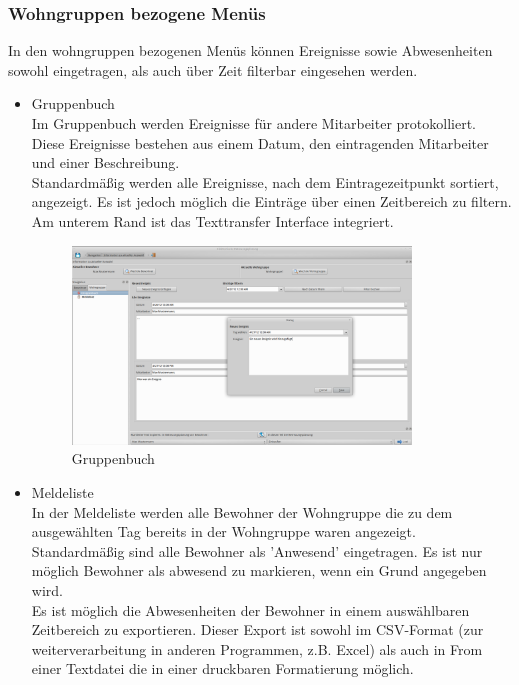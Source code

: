 \subsubsection{Wohngruppen bezogene Menüs}
In den wohngruppen bezogenen Menüs können Ereignisse sowie Abwesenheiten sowohl eingetragen, als auch über Zeit filterbar eingesehen werden.
\begin{itemize}
	\item Gruppenbuch\mbox{}\\
	\noindent
	Im Gruppenbuch werden Ereignisse für andere Mitarbeiter protokolliert. Diese Ereignisse bestehen aus einem Datum, den eintragenden Mitarbeiter und einer Beschreibung.\\Standardmäßig werden alle Ereignisse, nach dem Eintragezeitpunkt sortiert, angezeigt. Es ist jedoch möglich die Einträge über einen Zeitbereich zu filtern.\\Am unterem Rand ist das Texttransfer Interface integriert.
	\begin{figure}[h]
		\begin{center}
			\includegraphics[keepaspectratio=true, width=0.85\textwidth]{pics/client_ereignis.png}
			\caption{Gruppenbuch}
		\end{center}
	\end{figure}
	\FloatBarrier
	\newpage
	\item Meldeliste\mbox{}\\
	\noindent
	In der Meldeliste werden alle Bewohner der Wohngruppe die zu dem ausgewählten Tag bereits in der Wohngruppe waren angezeigt. Standardmäßig sind alle Bewohner als 'Anwesend' eingetragen. Es ist nur möglich Bewohner als abwesend zu markieren, wenn ein Grund angegeben wird.\\Es ist möglich die Abwesenheiten der Bewohner in einem auswählbaren Zeitbereich zu exportieren. Dieser Export ist sowohl im CSV-Format (zur weiterverarbeitung in anderen Programmen, z.B. Excel) als auch in From einer Textdatei die in einer druckbaren Formatierung möglich.

\end{itemize}
